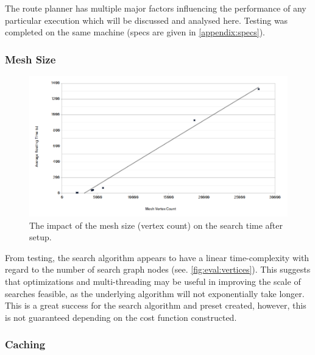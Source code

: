 \documentclass[12pt]{article}
\begin{document}
The route planner has multiple major factors influencing the performance of any particular execution which will be discussed and analysed here. Testing was completed on the same machine (specs are given in \autoref{appendix:specs}).

\subsubsection{Mesh Size}

\begin{figure}[H]
  \centering
  \includegraphics[width=\textwidth]{assets/searchtime-vertices.png}
  \caption{The impact of the mesh size (vertex count) on the search time after setup.}
  \label{fig:eval:vertices}
\end{figure}

From testing, the search algorithm appears to have a linear time-complexity with regard to the number of search graph nodes (see. \autoref{fig:eval:vertices}). This suggests that optimizations and multi-threading may be useful in improving the scale of searches feasible, as the underlying algorithm will not exponentially take longer. This is a great success for the search algorithm and preset created, however, this is not guaranteed depending on the cost function constructed.

\subsubsection{Caching}
\end{document}
